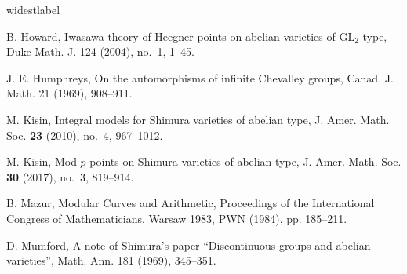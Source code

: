 \documentclass[11pt,oneside,reqno]{amsart}
\theoremstyle{plain}
\begin{document}
\begin{thebibliography}{widestlabel}
		
		
		
		
		
		
		B. Howard,
		Iwasawa theory of Heegner points on abelian varieties of $\mathrm{GL}_2$-type,
		Duke Math. J. 124 (2004), no.~1, 1--45.
		
		
		
		
		
		J. E. Humphreys,
		On the automorphisms of infinite Chevalley groups,
		Canad. J. Math. 21 (1969), 908--911.
		
		
		
		
		
		
		
		
		
		
		
		M. Kisin,
		Integral models for Shimura varieties of abelian type,
		J. Amer. Math. Soc. \textbf{23} (2010), no.~4, 967--1012.
		
		
		
		
		M. Kisin,
		Mod $p$ points on Shimura varieties of abelian type,
		J. Amer. Math. Soc. \textbf{30} (2017), no.~3, 819--914.
		
		
		
		B. Mazur,
		Modular Curves and Arithmetic,
		Proceedings of the International Congress of Mathematicians, Warsaw 1983, PWN (1984), pp. 185--211.
		
		
		
		
		
		D. Mumford,
		A note of Shimura's paper “Discontinuous groups and abelian varieties”,
		Math. Ann. 181 (1969), 345--351.
		
		
		
		

\end{thebibliography}
\end{document}
